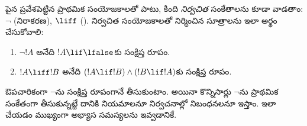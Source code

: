 \documentclass[../../../include/open-logic-section]{subfiles}
\begin{document}
పైన ప్రవేశపెట్టిన ప్రాథమిక సంయోజకాలతో పాటు,
కింది \emph{నిర్వచిత} సంకేతాలను కూడా వాడతాం:
$\lnot$ (నిరాకరణ), $\liff$
().
నిర్వచిత సంయోజకాలతో నిర్మించిన సూత్రాలను ఇలా
అర్థం చేసుకోవాలి:
\begin{enumerate}
\item $\lnot !A$ అనేది $!A \lif \lfalse$కు సంక్షిప్త రూపం.

\item $!A \liff !B$ అనేది $(!A \lif !B) \land (!B
  \lif !A)$కు సంక్షిప్త రూపం.
\end{enumerate}

ఔపచారికంగా $\lnot$ను సంక్షిప్త రూపంగానే తీసుకుంటాం.
అయినా కొన్నిసార్లు $\lnot$ను ప్రాథమిక సంకేతంగా తీసుకున్నట్టే
దానికి నియమాలనూ నిర్వచనాల్లో నిబంధనలనూ ఇస్తాం.
ఇలా చేయడం ముఖ్యంగా అభ్యాస సమస్యలను ఇవ్వడానికే.
\end{document}
